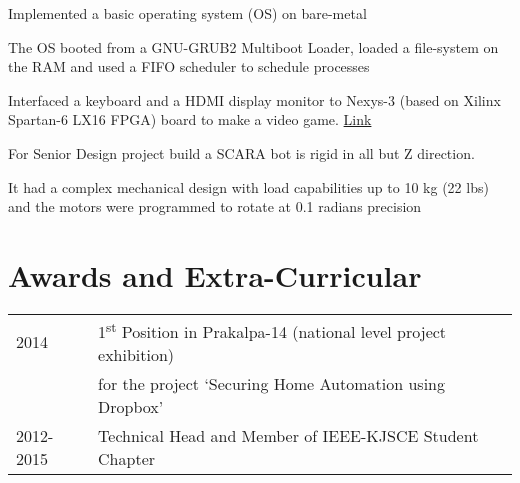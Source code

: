 \documentclass[]{deedy_format_Anmol}
\begin{document}
\begin{minipage}[t]{0.66\textwidth}
\vspace{1mm}
\justify
\begin{tightemize}
\item Implemented a basic operating system (OS) on bare-metal
\item The OS booted from a GNU-GRUB2 Multiboot Loader, loaded a file-system on the RAM and used a FIFO scheduler to schedule processes
\end{tightemize}
\vspace{\topsep}
\sectionsep

\vspace{1mm}
\justify
\begin{tightemize}
\item Interfaced a keyboard and a HDMI display monitor to Nexys-3 (based on Xilinx Spartan-6 LX16 FPGA) board to make a video game.  \href{https://youtu.be/s36H25OkzVQ}{Link}
\end{tightemize}
\vspace{\topsep}
\sectionsep

\vspace{1mm}
\justify
\begin{tightemize}
\item For Senior Design project build a SCARA bot is rigid in all but Z direction. 
\item It had a complex mechanical design with load capabilities up to 10 kg (22 lbs) and the motors were programmed to rotate at 0.1 radians precision
\end{tightemize} 
\vspace{\topsep}
\sectionsep


\section{Awards and Extra-Curricular}
\vspace{\topsep} %
\vspace{1mm}
\justify
\begin{tabular}{ll}
2014 & 1\textsuperscript{st} Position in Prakalpa-14 (national level project exhibition) \\
& for the project `Securing Home Automation using Dropbox'\\
2012-2015 & Technical Head and Member of IEEE-KJSCE Student Chapter \\
\end{tabular}

\end{minipage} 
\end{document}
